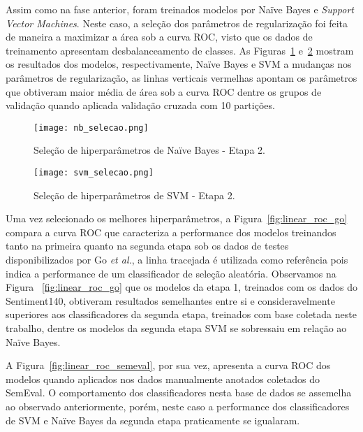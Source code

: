 Assim como na fase anterior, foram treinados modelos por Naïve Bayes e \textit{Support Vector Machines}.
Neste caso, a seleção dos parâmetros de regularização foi feita de maneira a maximizar a área sob a curva ROC, visto que
os dados de treinamento apresentam desbalanceamento de classes.
As Figuras~\ref{fig:nb_selecao} e~\ref{fig:svm_selecao} mostram os resultados dos modelos, respectivamente, Naïve Bayes e
SVM a mudanças nos parâmetros de regularização, as linhas verticais vermelhas apontam os parâmetros que obtiveram maior
média de área sob a curva ROC dentre os grupos de validação quando aplicada validação cruzada com 10 partições.

\begin{figure}
\begin{center} {
    \begin{center}
    \texttt{[image: nb\_selecao.png]}
    \caption{Seleção de hiperparâmetros de Naïve Bayes - Etapa 2.}
    \label{fig:nb_selecao}
    \end{center}
}
\end{center}
\end{figure}

\begin{figure}
\begin{center} {
    \begin{center}
    \texttt{[image: svm\_selecao.png]}
    \caption{Seleção de hiperparâmetros de SVM - Etapa 2.}
    \label{fig:svm_selecao}
    \end{center}
}
\end{center}
\end{figure}

Uma vez selecionado os melhores hiperparâmetros, a Figura~\ref{fig:linear_roc_go} compara a curva ROC que caracteriza a
performance dos modelos treinandos tanto na primeira quanto na segunda etapa sob os dados de testes disponibilizados
por Go \textit{et al.}, a linha tracejada é utilizada como referência pois indica a performance de um classificador de
seleção aleatória.
Observamos na Figura ~\ref{fig:linear_roc_go} que os modelos da etapa 1, treinados com os dados do Sentiment140,
obtiveram resultados semelhantes entre si e consideravelmente superiores aos classificadores da segunda etapa, treinados
com base coletada neste trabalho, dentre os modelos da segunda etapa SVM se sobressaiu em relação ao Naïve Bayes.

A Figura~\ref{fig:linear_roc_semeval}, por sua vez, apresenta a curva ROC dos modelos quando aplicados nos dados
manualmente anotados coletados do SemEval.
O comportamento dos classificadores nesta base de dados se assemelha ao observado anteriormente, porém, neste caso a
performance dos classificadores de SVM e Naïve Bayes da segunda etapa praticamente se igualaram.

